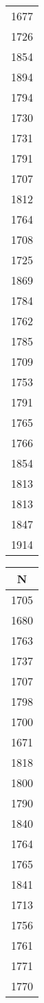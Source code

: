 \begin{table}[H]
\begin{tabular}{|c|}
    1677\\
    1726\\
    1854\\
    1894\\
    1794\\
    1730\\
    1731\\
    1791\\
    1707\\
    1812\\
    1764\\
    1708\\
    1725\\
    1869\\
    1784\\
    1762\\
    1785\\
    1709\\
    1753\\
    1791\\
    1765\\
    1766\\
    1854\\
    1813\\
    1813\\
    1847\\
    1914\\
    \bottomrule
  \end{tabular}
  \begin{tabular}{|c|}
    \toprule
    {N}\\
    \midrule
    1705\\
    1680\\
    1763\\
    1737\\
    1707\\
    1798\\
    1700\\
    1671\\
    1818\\
    1800\\
    1790\\
    1840\\
    1764\\
    1765\\
    1841\\
    1713\\
    1756\\
    1761\\
    1771\\
    1770\\

\end{tabular}
\end{table}
